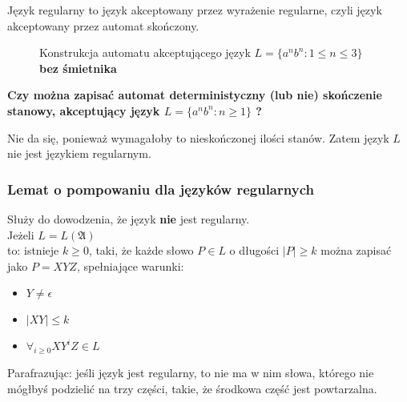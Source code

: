 \documentclass{../notatki}
\begin{document}
Język regularny to język akceptowany przez wyrażenie regularne, czyli
język akceptowany przez automat skończony.

\begin{figure}[H]
  \centering
  \caption{Konstrukcja automatu akceptującego język $L = \{a^nb^n : 1
  \le n \le 3\}$ \textbf{bez śmietnika}}
  \label{fig:cls:ex2}
\end{figure}

\par \noindent \textbf{Czy można zapisać automat deterministyczny
(lub nie) skończenie stanowy, akceptujący język $L = \{a^nb^n : n \ge 1\}$ ?}

Nie da się, ponieważ wymagałoby to nieskończonej ilości stanów. Zatem
język $L$ nie jest językiem regularnym.

\subsubsection{Lemat o pompowaniu dla języków regularnych}

Służy do dowodzenia, że język \textbf{nie} jest regularny. \\
Jeżeli $L = L(\mathfrak{A})$\\to: istnieje $k \ge 0$, taki, że każde
słowo $P \in L$ o długości $|P| \ge k$ można zapisać jako $P = XYZ$,
spełniające warunki:\\
\begin{itemize}
  \item $Y \ne \epsilon$
  \item $|XY| \le k$
  \item $\forall_{i \ge 0} XY^iZ \in L$
\end{itemize}
Parafrazując: jeśli język jest regularny, to nie ma w nim słowa,
którego nie mógłbyś podzielić na trzy części, takie, że środkowa
część jest powtarzalna. \\
\end{document}
